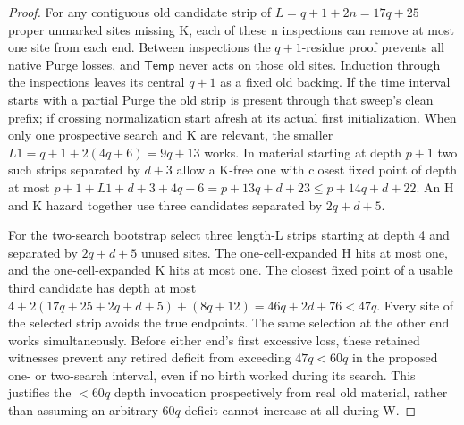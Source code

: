 \begin{proof}
For any contiguous old candidate strip of \(L=q+1+2n=17q+25\) proper unmarked sites missing K, each of these n inspections can remove at most one site from each end. Between inspections the \(q+1\)-residue proof prevents all native Purge losses, and \(\mathsf{Temp}\) never acts on those old sites. Induction through the inspections leaves its central \(q+1\) as a fixed old backing. If the time interval starts with a partial Purge the old strip is present through that sweep's clean prefix; if crossing normalization start afresh at its actual first initialization. When only one prospective search and K are relevant, the smaller \(L1=q+1+2(4q+6)=9q+13\) works. In material starting at depth \(p+1\) two such strips separated by \(d+3\) allow a K-free one with closest fixed point of depth at most \(p+1+L1+d+3+4q+6=p+13q+d+23\le p+14q+d+22\). An H and K hazard together use three candidates separated by \(2q+d+5\).

For the two-search bootstrap select three length-L strips starting at depth 4 and separated by \(2q+d+5\) unused sites. The one-cell-expanded H hits at most one, and the one-cell-expanded K hits at most one. The closest fixed point of a usable third candidate has depth at most
\(4+2(17q+25+2q+d+5)+(8q+12)=46q+2d+76<47q\).
Every site of the selected strip avoids the true endpoints. The same selection at the other end works simultaneously. Before either end's first excessive loss, these retained witnesses prevent any retired deficit from exceeding \(47q<60q\) in the proposed one- or two-search interval, even if no birth worked during its search. This justifies the \(<60q\) depth invocation prospectively from real old material, rather than assuming an arbitrary \(60q\) deficit cannot increase at all during W.


\end{proof}

